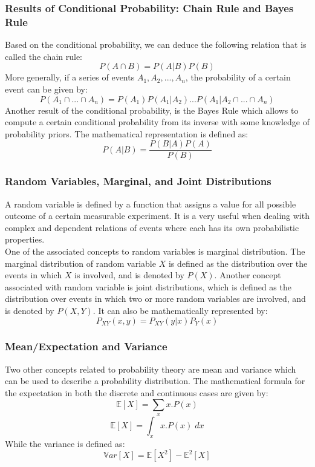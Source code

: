 \documentclass{article}
\begin{document}
\subsubsection{Results of Conditional Probability: Chain Rule and Bayes Rule}
Based on the conditional probability, we can deduce the following relation that is called the chain rule:
\begin{equation}
P(A \cap B) = P(A|B) P(B)
\end{equation}
More generally, if a series of events $A_1, A_2, ..., A_n$, the probability of a certain event can be given by:
\begin{equation}
P(A_1 \cap ... \cap A_n) = P(A_1)P(A_1|A_2) ... P(A_1|A_2 \cap ... \cap A_n)
\end{equation}
Another result of the conditional probability, is the Bayes Rule which allows to compute a certain conditional probability from its inverse with some knowledge of probability priors. The mathematical representation is defined as:
\begin{equation}
P(A|B) = \frac{P(B|A)P(A)}{P(B)}
\end{equation}

\subsubsection{Random Variables, Marginal, and Joint Distributions}
A random variable is defined by a function that assigns a value for all possible outcome of a certain measurable experiment. It is a very useful when dealing with complex and dependent relations of events where each has its own probabilistic properties. \\ 
One of the associated concepts to random variables is marginal distribution. The marginal distribution of random variable $X$ is defined as the distribution over the events in which $X$ is involved, and is denoted by $P(X)$. Another concept associated with random variable is joint distributions, which is defined as the distribution over events in which two or more random variables are involved, and is denoted by $P(X,Y)$. It can also be mathematically represented by:
\begin{equation}
P_{XY}(x,y) = P_{XY}(y|x)P_Y(x)
\end{equation}

\subsubsection{Mean/Expectation and Variance}
Two other concepts related to probability theory are mean and variance which can be used to describe a probability distribution. The mathematical formula for the expectation in both the discrete and continuous cases are given by:
\begin{equation}
\mathbb{E} [X] = \sum_x x.P(x)
\end{equation}
\begin{equation}
\mathbb{E} [X] = \int_x x.P(x) \; dx
\end{equation}
While the variance is defined as: 
\begin{equation}
\mathbb{V}ar [X] = \mathbb{E} [X^2] - \mathbb{E}^2 [X]
\end{equation}
\end{document}
